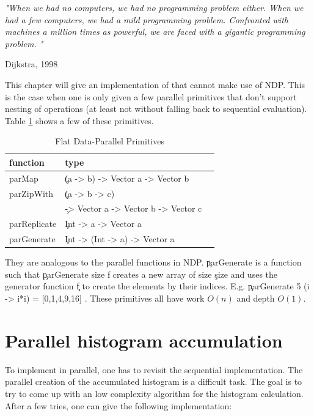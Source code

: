 
\epigraph{\emph{
"When we had no computers, we had no programming problem either.
When we had a few computers, we had a mild programming problem.
Confronted with machines a million times as powerful,
we are faced with a gigantic programming problem. "
}}{
Dijkstra, 1998
}

This chapter will give an implementation of \algo
that cannot make use of NDP. This is
the case when one is only given a few parallel primitives
that don't support nesting
of operations (at least not without falling back to sequential evaluation).
Table \ref{table:parprims} shows a few of these primitives.

  \begin{table}[h!]
    \caption{Flat Data-Parallel Primitives}
    \label{table:parprims}
    \begin{center}
    \begin{tabular}{lll}
      \toprule
      function & type \\
      \midrule
      parMap & \c{(a -> b) -> Vector a -> Vector b} \\
      parZipWith & \c{(a -> b -> c)} \\
       & \c{-> Vector a -> Vector b -> Vector c} \\
      parReplicate & \c{Int -> a -> Vector a} \\
      parGenerate & \c{Int -> (Int -> a) -> Vector a} \\
    \end{tabular}
    \end{center}
  \end{table}
  They are analogous to the parallel functions in NDP.
  \c{parGenerate} is a function such that \c{parGenerate size f} creates a new array
  of size \c{size} and uses the generator function \c{f} to create
  the elements by their indices.
  E.g. \c{parGenerate 5 (\lam i -> i*i) = [0,1,4,9,16] }.
  These primitives all have work $O(n)$ and depth $O(1)$.
  
\section{Parallel histogram accumulation}
  To implement \algo in parallel, one has to revisit the sequential
  implementation. The parallel creation of the accumulated histogram is
  a difficult task. The goal is to try to come up with
  an low complexity algorithm for the histogram calculation.
  After a few tries, one can give the following implementation:
  
